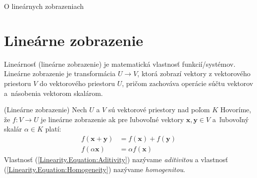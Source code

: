 \documentclass[a4paper, 10pt, ]{article}
\begin{document}
\begin{flushleft}
	O lineárnych zobrazeniach
\end{flushleft}

\bigskip

\normalsize
\normalfont




\section{Lineárne zobrazenie}
\label{Linearity}

Lineárnosť (lineárne zobrazenie) je matematická vlastnosť funkcií/systémov. Lineárne zobrazenie je transformácia $U \rightarrow V$, ktorá zobrazí vektory z vektorového priestoru $V$ do vektorového priestoru $U$, pričom zachováva operácie súčtu vektorov a~násobenia vektorom skalárom.

\begin{definition}(Lineárne zobrazenie)
    Nech $U$ a $V$ sú vektorové priestory nad poľom $K$ Hovoríme, že $f: V \rightarrow U$ je lineárne zobrazenie ak pre ľubovoľné vektory $\bm{x}, \bm{y} \in V$ a~ľubovoľný skalár $\alpha \in K$ platí:
    \begin{subequations}
        \begin{align}
            \label{Linearity.Equation:Aditivity}
            f(\bm{x} + \bm{y}) &= f(\bm{x}) + f(\bm{y}) \\[6pt]
            \label{Linearity.Equation:Homogeneity}
            f(\alpha \bm{x})   &= \alpha f(\bm{x})
        \end{align}
    \end{subequations}
    Vlastnosť (\ref{Linearity.Equation:Aditivity}) nazývame \textit{aditivitou} a vlastnosť (\ref{Linearity.Equation:Homogeneity}) nazývame \textit{homogenitou}.
\end{definition}
\end{document}
